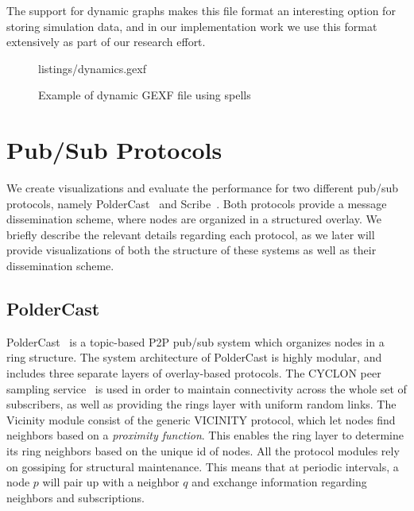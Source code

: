 The support for dynamic graphs makes this file format an interesting
option for storing simulation data, and in our implementation work we
use this format extensively as part of our research effort.

\begin{figure}[h]
 {listings/dynamics.gexf}
\caption{Example of  dynamic GEXF file using spells}
\end{figure}

\section{Pub/Sub Protocols} We create visualizations and evaluate the
performance for two different pub/sub protocols, namely
PolderCast~\cite{Setty:2012} and Scribe~\cite{Voulgaris:2005}. Both
protocols provide a message dissemination scheme, where nodes are
organized in a structured overlay. We briefly describe the relevant
details regarding each protocol, as we later will provide visualizations
of both the structure of these systems as well as their dissemination
scheme.

\subsection{PolderCast}
PolderCast~\cite{Setty:2012} is a topic-based P2P pub/sub system which
organizes nodes in a ring structure. The system architecture of
PolderCast is highly modular, and includes three separate layers of
overlay-based protocols. The CYCLON peer sampling service~\cite{Voulgaris:2005} is used
in order to maintain connectivity across the whole set of subscribers,
as well as providing the rings layer with uniform random links. The
Vicinity module consist of the generic VICINITY protocol, which let
nodes find neighbors based on a \emph{proximity function}. This enables
the ring layer to determine its ring neighbors based on the unique id of
nodes. All the protocol modules rely on gossiping for structural
maintenance. This means that at periodic intervals, a node $p$ will pair up with a
neighbor $q$ and exchange information regarding neighbors and
subscriptions.

